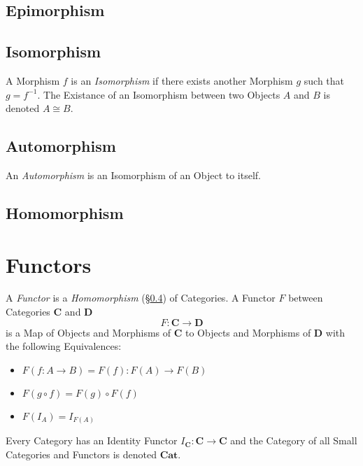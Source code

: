 \documentclass{article}
\begin{document}
\subsection{Epimorphism}

\subsection{Isomorphism}\label{subsec:isomorphism}

A Morphism $f$ is an \emph{Isomorphism} if there exists another
Morphism $g$ such that $g = f^{-1}$. The Existance of an Isomorphism
between two Objects $A$ and $B$ is denoted $A \cong B$.

\subsection{Automorphism}\label{subsec:automorphism}

An \emph{Automorphism} is an Isomorphism of an Object to itself.

\subsection{Homomorphism}\label{subsec:homomorphism}

\section{Functors}\label{sec:category_functors}

A \emph{Functor} is a \emph{Homomorphism}
(\S\ref{subsec:homomorphism}) of Categories. A Functor $F$ between
Categories $\mathbf{C}$ and $\mathbf{D}$
\[
    F : \mathbf{C} \rightarrow \mathbf{D}
\]
is a Map of Objects and Morphisms of $\mathbf{C}$ to Objects and
Morphisms of $\mathbf{D}$ with the following Equivalences:
\begin{itemize}
\item $F(f : A \rightarrow B) = F(f) : F(A) \rightarrow F(B)$
\item $F(g \circ f) = F(g) \circ F(f)$
\item $F(I_A) = I_{F(A)}$
\end{itemize}
Every Category has an Identity Functor $I_{\mathbf{C}} : \mathbf{C}
\rightarrow \mathbf{C}$ and the Category of all Small Categories and
Functors is denoted $\mathbf{Cat}$.
\end{document}
